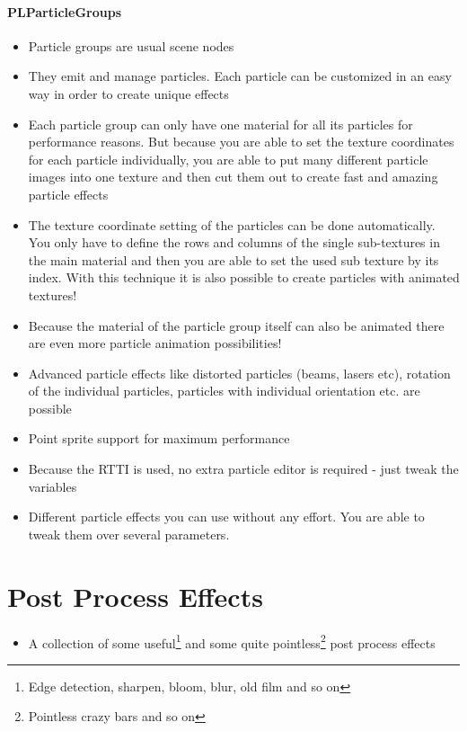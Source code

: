 \paragraph{PLParticleGroups}
\begin{itemize}
\item{Particle groups are usual scene nodes}
\item{They emit and manage particles. Each particle can be customized in an easy way in order to create unique effects}
\item{Each particle group can only have one material for all its particles for performance reasons. But because you are able to set the texture coordinates for each particle individually, you are able to put many different particle images into one texture and then cut them out to create fast and amazing particle effects}
\item{The texture coordinate setting of the particles can be done automatically. You only have to define the rows and columns of the single sub-textures in the main material and then you are able to set the used sub texture by its index. With this technique it is also possible to create particles with animated textures!}
\item{Because the material of the particle group itself can also be animated there are even more particle animation possibilities!}
\item{Advanced particle effects like distorted particles (beams, lasers etc), rotation of the individual particles, particles with individual orientation etc. are possible}
\item{Point sprite support for maximum performance}
\item{Because the \ac{RTTI} is used, no extra particle editor is required - just tweak the variables}
\item{Different particle effects you can use without any effort. You are able to tweak them over several parameters.}
\end{itemize}




\section{Post Process Effects}
\begin{itemize}
\item{A collection of some useful\footnote{Edge detection, sharpen, bloom, blur, old film and so on} and some quite pointless\footnote{Pointless crazy bars and so on} post process effects}
\end{itemize}




